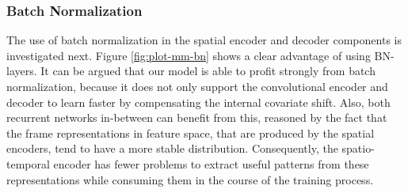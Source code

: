 \subsubsection*{Batch Normalization}

The use of batch normalization in the spatial encoder and decoder components is investigated next. Figure \ref{fig:plot-mm-bn} shows a clear advantage of using BN-layers. It can be argued that our model is able to profit strongly from  batch normalization, because it does not only support the convolutional encoder and decoder to learn faster by compensating the internal covariate shift. Also, both recurrent networks in-between can benefit from this, reasoned by the fact that the frame representations in feature space, that are produced by the spatial encoders, tend to have a more stable distribution. Consequently, the spatio-temporal encoder has fewer problems to extract useful patterns from these representations while consuming them in the course of the training process.

